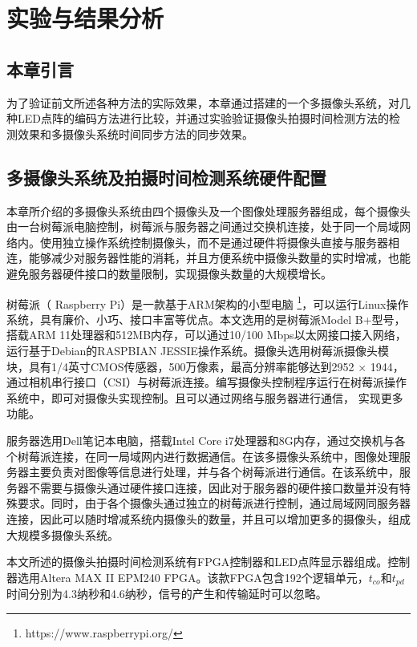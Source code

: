 \chapter{实验与结果分析}

\section{本章引言}

为了验证前文所述各种方法的实际效果，本章通过搭建的一个多摄像头系统，对几种LED点阵的编码方法进行比较，并通过实验验证摄像头拍摄时间检测方法的检测效果和多摄像头系统时间同步方法的同步效果。

\section{多摄像头系统及拍摄时间检测系统硬件配置}

本章所介绍的多摄像头系统由四个摄像头及一个图像处理服务器组成，每个摄像头由一台树莓派电脑控制，树莓派与服务器之间通过交换机连接，处于同一个局域网络内。使用独立操作系统控制摄像头，而不是通过硬件将摄像头直接与服务器相连，能够减少对服务器性能的消耗，并且方便系统中摄像头数量的实时增减，也能避免服务器硬件接口的数量限制，实现摄像头数量的大规模增长。

树莓派（ Raspberry Pi）是一款基于ARM架构的小型电脑 \footnote{https://www.raspberrypi.org/}，可以运行Linux操作系统，具有廉价、小巧、接口丰富等优点。本文选用的是树莓派Model B+型号，搭载ARM 11处理器和512MB内存，可以通过10/100 Mbps以太网接口接入网络，运行基于Debian的RASPBIAN JESSIE操作系统。摄像头选用树莓派摄像头模块，具有1/4英寸CMOS传感器，500万像素，最高分辨率能够达到2952 × 1944，通过相机串行接口（CSI）与树莓派连接。编写摄像头控制程序运行在树莓派操作系统中，即可对摄像头实现控制。且可以通过网络与服务器进行通信， 实现更多功能。

服务器选用Dell笔记本电脑，搭载Intel Core i7处理器和8G内存，通过交换机与各个树莓派连接，在同一局域网内进行数据通信。在该多摄像头系统中，图像处理服务器主要负责对图像等信息进行处理，并与各个树莓派进行通信。在该系统中，服务器不需要与摄像头通过硬件接口连接，因此对于服务器的硬件接口数量并没有特殊要求。同时，由于各个摄像头通过独立的树莓派进行控制，通过局域网同服务器连接，因此可以随时增减系统内摄像头的数量，并且可以增加更多的摄像头，组成大规模多摄像头系统。

本文所述的摄像头拍摄时间检测系统有FPGA控制器和LED点阵显示器组成。控制器选用Altera MAX II EPM240 FPGA。该款FPGA包含192个逻辑单元，$t_{co}$和$t_{pd}$时间分别为4.3纳秒和4.6纳秒，信号的产生和传输延时可以忽略。


